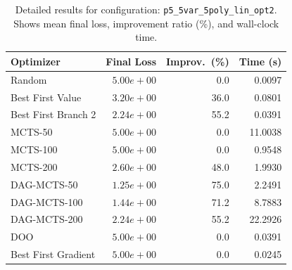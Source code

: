 \begin{table}[H]
\centering
\caption{Detailed results for configuration: \texttt{p5\_5var\_5poly\_lin\_opt2}. Shows mean final loss, improvement ratio (\%), and wall-clock time.}
\label{tab:abssum-detail-36}
\begin{tabular}{lrrr}
\toprule
Optimizer & Final Loss & Improv.~(\%) & Time (s) \\
\midrule
Random & $5.00e+00$ & 0.0 & 0.0097 \\
\hline
Best First Value & $3.20e+00$ & 36.0 & 0.0801 \\
\hline
Best First Branch 2 & $2.24e+00$ & 55.2 & 0.0391 \\
\hline
MCTS-50 & $5.00e+00$ & 0.0 & 11.0038 \\
\hline
MCTS-100 & $5.00e+00$ & 0.0 & 0.9548 \\
\hline
MCTS-200 & $2.60e+00$ & 48.0 & 1.9930 \\
\hline
DAG-MCTS-50 & \textbf{$1.25e+00$} & 75.0 & 2.2491 \\
\hline
DAG-MCTS-100 & $1.44e+00$ & 71.2 & 8.7883 \\
\hline
DAG-MCTS-200 & $2.24e+00$ & 55.2 & 22.2926 \\
\hline
DOO & $5.00e+00$ & 0.0 & 0.0391 \\
\hline
Best First Gradient & $5.00e+00$ & 0.0 & 0.0245 \\
\bottomrule
\end{tabular}
\end{table}

